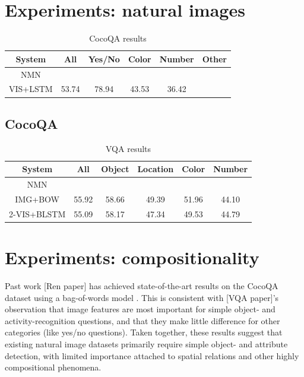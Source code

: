 \documentclass[10pt,twocolumn,letterpaper]{article}
\begin{document}
\section{Experiments: natural images}

\begin{table}[h]
  \footnotesize
  \center
  \begin{tabular}{cccccc}
    \toprule
    System & All & Yes/No & Color & Number & Other \\
    \midrule
    NMN \\
    VIS+LSTM & 53.74 & 78.94 & 43.53 & 36.42 & \\
    \bottomrule
  \end{tabular}
  \caption{CocoQA results}
\end{table}

\subsection{CocoQA}

\begin{table}[h]
  \footnotesize
  \center
  \begin{tabular}{cccccc}
    \toprule
    System & All & Object & Location & Color & Number \\
    \midrule
    NMN \\
    IMG+BOW & 55.92 & 58.66 & 49.39 & 51.96 & 44.10 \\
    2-VIS+BLSTM & 55.09 & 58.17 & 47.34 & 49.53 & 44.79 \\
    \bottomrule
  \end{tabular}
  \caption{VQA results}
\end{table}


\section{Experiments: compositionality}

Past work [Ren paper] has achieved state-of-the-art results on the CocoQA dataset using a bag-of-words model . This is consistent with [VQA paper]'s observation that image features are most important for simple object- and activity-recognition questions, and that they make little difference for other categories (like yes/no questions). Taken together, these results suggest that existing natural image datasets primarily require simple object- and attribute detection, with limited importance attached to spatial relations and other highly compositional phenomena.
\end{document}
